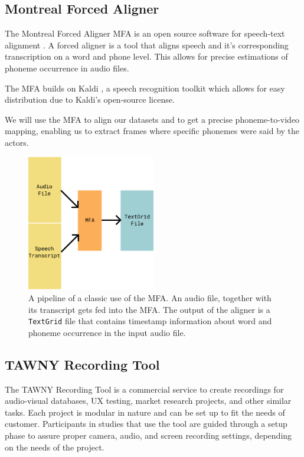 \subsection{Montreal Forced Aligner}
\label{sub:mfa}
The Montreal Forced Aligner MFA is an open source software for speech-text alignment \cite{mcauliffe2017montreal}. A forced aligner is a tool that aligns speech and it's corresponding transcription on a word and phone level. This allows for precise estimations of phoneme occurrence in audio files.

The MFA builds on Kaldi \cite{povey2011kaldi}, a speech recognition toolkit which allows for easy distribution due to Kaldi's open-source license.

We will use the MFA to align our datasets and to get a precise phoneme-to-video mapping, enabling us to extract frames where specific phonemes were said by the actors.

\begin{figure}
    \centering
    \includegraphics[width=0.5\textwidth]{res/png_backup/mfapipeline.png}
    \caption{A pipeline of a classic use of the MFA. An audio file, together with its transcript gets fed into the MFA. The output of the aligner is a \texttt{TextGrid} file that contains timestamp information about word and phoneme occurrence in the input audio file.}
    \label{fig:mfa}
\end{figure}

\subsection{TAWNY Recording Tool}
The TAWNY Recording Tool \cite{tawny2021} is a commercial service to create recordings for audio-visual databases, UX testing, market research projects, and other similar tasks. Each project is modular in nature and can be set up to fit the needs of customer. Participants in studies that use the tool are guided through a setup phase to assure proper camera, audio, and screen recording settings, depending on the needs of the project. 

